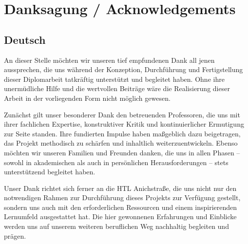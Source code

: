 \chapter{Danksagung / Acknowledgements}
\label{cha:acknowledgements}

\section*{Deutsch}

An dieser Stelle möchten wir unseren tief empfundenen Dank all jenen aussprechen, die uns während der Konzeption, Durchführung und Fertigstellung dieser Diplomarbeit tatkräftig unterstützt und begleitet haben. Ohne ihre unermüdliche Hilfe und die wertvollen Beiträge wäre die Realisierung dieser Arbeit in der vorliegenden Form nicht möglich gewesen.

Zunächst gilt unser besonderer Dank den betreuenden Professoren, die uns mit ihrer fachlichen Expertise, konstruktiver Kritik und kontinuierlicher Ermutigung zur Seite standen. Ihre fundierten Impulse haben maßgeblich dazu beigetragen, das Projekt methodisch zu schärfen und inhaltlich weiterzuentwickeln. Ebenso möchten wir unseren Familien und Freunden danken, die uns in allen Phasen – sowohl in akademischen als auch in persönlichen Herausforderungen – stets unterstützend begleitet haben.

Unser Dank richtet sich ferner an die HTL Anichstraße, die uns nicht nur den notwendigen Rahmen zur Durchführung dieses Projekts zur Verfügung gestellt, sondern uns auch mit den erforderlichen Ressourcen und einem inspirierenden Lernumfeld ausgestattet hat. Die hier gewonnenen Erfahrungen und Einblicke werden uns auf unserem weiteren beruflichen Weg nachhaltig begleiten und prägen.

